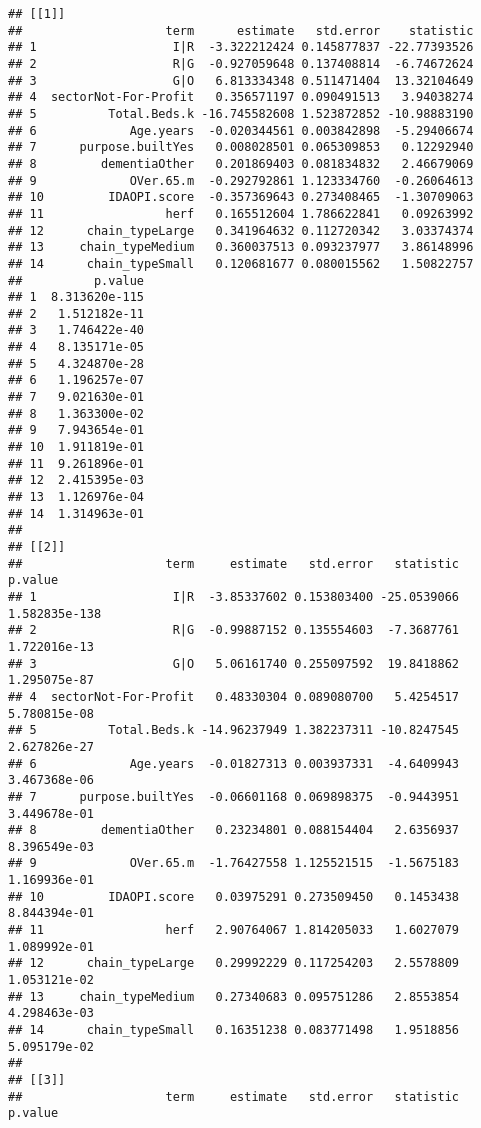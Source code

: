 \documentclass[]{article}
\begin{document}
\begin{verbatim}
## [[1]]
##                    term      estimate   std.error    statistic
## 1                   I|R  -3.322212424 0.145877837 -22.77393526
## 2                   R|G  -0.927059648 0.137408814  -6.74672624
## 3                   G|O   6.813334348 0.511471404  13.32104649
## 4  sectorNot-For-Profit   0.356571197 0.090491513   3.94038274
## 5          Total.Beds.k -16.745582608 1.523872852 -10.98883190
## 6             Age.years  -0.020344561 0.003842898  -5.29406674
## 7      purpose.builtYes   0.008028501 0.065309853   0.12292940
## 8         dementiaOther   0.201869403 0.081834832   2.46679069
## 9             OVer.65.m  -0.292792861 1.123334760  -0.26064613
## 10         IDAOPI.score  -0.357369643 0.273408465  -1.30709063
## 11                 herf   0.165512604 1.786622841   0.09263992
## 12      chain_typeLarge   0.341964632 0.112720342   3.03374374
## 13     chain_typeMedium   0.360037513 0.093237977   3.86148996
## 14      chain_typeSmall   0.120681677 0.080015562   1.50822757
##          p.value
## 1  8.313620e-115
## 2   1.512182e-11
## 3   1.746422e-40
## 4   8.135171e-05
## 5   4.324870e-28
## 6   1.196257e-07
## 7   9.021630e-01
## 8   1.363300e-02
## 9   7.943654e-01
## 10  1.911819e-01
## 11  9.261896e-01
## 12  2.415395e-03
## 13  1.126976e-04
## 14  1.314963e-01
## 
## [[2]]
##                    term     estimate   std.error   statistic       p.value
## 1                   I|R  -3.85337602 0.153803400 -25.0539066 1.582835e-138
## 2                   R|G  -0.99887152 0.135554603  -7.3687761  1.722016e-13
## 3                   G|O   5.06161740 0.255097592  19.8418862  1.295075e-87
## 4  sectorNot-For-Profit   0.48330304 0.089080700   5.4254517  5.780815e-08
## 5          Total.Beds.k -14.96237949 1.382237311 -10.8247545  2.627826e-27
## 6             Age.years  -0.01827313 0.003937331  -4.6409943  3.467368e-06
## 7      purpose.builtYes  -0.06601168 0.069898375  -0.9443951  3.449678e-01
## 8         dementiaOther   0.23234801 0.088154404   2.6356937  8.396549e-03
## 9             OVer.65.m  -1.76427558 1.125521515  -1.5675183  1.169936e-01
## 10         IDAOPI.score   0.03975291 0.273509450   0.1453438  8.844394e-01
## 11                 herf   2.90764067 1.814205033   1.6027079  1.089992e-01
## 12      chain_typeLarge   0.29992229 0.117254203   2.5578809  1.053121e-02
## 13     chain_typeMedium   0.27340683 0.095751286   2.8553854  4.298463e-03
## 14      chain_typeSmall   0.16351238 0.083771498   1.9518856  5.095179e-02
## 
## [[3]]
##                    term     estimate   std.error   statistic       p.value

\end{verbatim}
\end{document}
